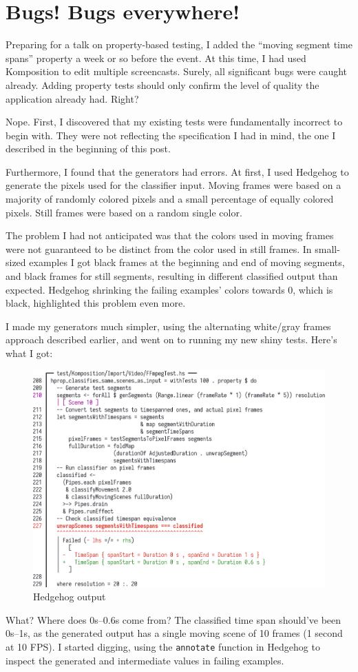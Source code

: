 \section{Bugs! Bugs everywhere!}

Preparing for a talk on property-based testing, I added the ``moving segment time spans'' property a week or so before the event. At this time, I had used Komposition to edit multiple screencasts. Surely, all significant bugs were caught already. Adding property tests should only confirm the level of quality the application already had. Right?

Nope. First, I discovered that my existing tests were fundamentally incorrect to begin with. They were not reflecting the specification I had in mind, the one I described in the beginning of this post.

Furthermore, I found that the generators had errors. At first, I used Hedgehog to generate the pixels used for the classifier input. Moving frames were based on a majority of randomly colored pixels and a small percentage of equally colored pixels. Still frames were based on a random single color.

The problem I had not anticipated was that the colors used in moving frames were not guaranteed to be distinct from the color used in still frames. In small-sized examples I got black frames at the beginning and end of moving segments, and black frames for still segments, resulting in different classified output than expected. Hedgehog shrinking the failing examples' colors towards 0, which is black, highlighted this problem even more.

I made my generators much simpler, using the alternating white/gray frames approach described earlier, and went on to running my new shiny tests. Here's what I got:
\begin{figure}[htbp]
 \centering
 \includegraphics[width=.95\linewidth]{./pics/case2_3.png}
 \caption{Hedgehog output}
 \label{fig:case2_3}
\end{figure}
What? Where does 0s--0.6s come from? The classified time span should've been 0s--1s, as the generated output has a single moving scene of 10 frames (1 second at 10 FPS). I started digging, using the \texttt{annotate} function in Hedgehog to inspect the generated and intermediate values in failing examples.

